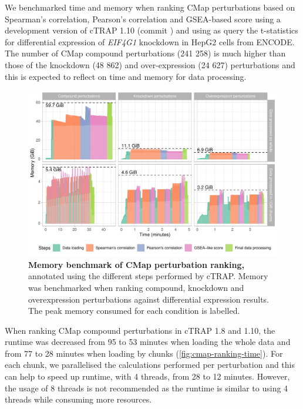 We benchmarked time and memory when ranking CMap perturbations based on Spearman's correlation, Pearson's correlation and GSEA-based score using a development version of cTRAP 1.10 (commit ) and using as query the t-statistics for differential expression of \emph{EIF4G1} knockdown in HepG2 cells from ENCODE. The number of CMap compound perturbations (241 258) is much higher than those of the knockdown (48 862) and over-expression (24 627) perturbations and this is expected to reflect on time and memory for data processing.

\begin{figure}[!b]
  \vspace{-\intextsep}
  \includegraphics[width=\textwidth]{images/ctrap/ranking-memory}
  \centering
  \vspace{-\intextsep}
  \caption[Memory benchmark of CMap perturbation ranking]{\textbf{Memory benchmark of CMap perturbation ranking,} annotated using the different steps performed by cTRAP. Memory was benchmarked when ranking compound, knockdown and overexpression perturbations against differential expression results. The peak memory consumed for each condition is labelled.}
  \label{fig:cmap-ranking-memory}
\end{figure}

When ranking CMap compound perturbations in cTRAP 1.8 and 1.10, the runtime was decreased from 95 to 53 minutes when loading the whole data and from 77 to 28 minutes when loading by chunks (\autoref{fig:cmap-ranking-time}). For each chunk, we parallelised the calculations performed per perturbation and this can help to speed up runtime, with 4 threads, from 28 to 12 minutes. However, the usage of 8 threads is not recommended as the runtime is similar to using 4 threads while consuming more resources.

